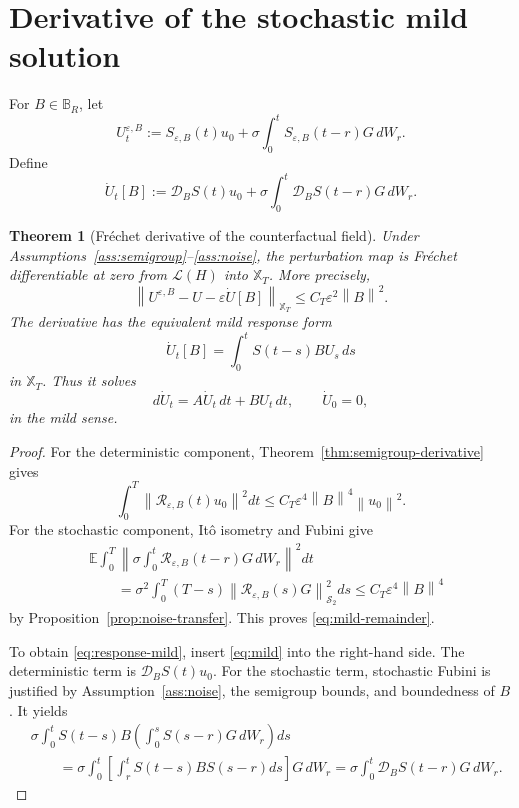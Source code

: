 \documentclass[11pt]{article}
\newtheorem{theorem}[assumption]{Theorem}
\theoremstyle{remark}
\newcommand{\E}{\mathbb E}
\newcommand{\cL}{\mathcal L}
\newcommand{\cX}{\mathbb X_T}
\newcommand{\HS}{\mathcal S_2}
\newcommand{\norm}[1]{\left\lVert #1\right\rVert}
\begin{document}
\section{Derivative of the stochastic mild solution}

For $B\in\mathbb B_R$, let
\begin{equation}\label{eq:pert-mild}
 U_t^{\varepsilon,B}
 :=
 S_{\varepsilon,B}(t)u_0
 +\sigma\int_0^tS_{\varepsilon,B}(t-r)G\,dW_r.
\end{equation}
Define
\begin{equation}\label{eq:dotU}
 \dot U_t[B]
 :=
 \mathcal D_BS(t)u_0
 +\sigma\int_0^t\mathcal D_BS(t-r)G\,dW_r.
\end{equation}

\begin{theorem}[Fr\'echet derivative of the counterfactual field]\label{thm:mild-derivative}
Under Assumptions~\ref{ass:semigroup}--\ref{ass:noise}, the perturbation map is Fr\'echet differentiable at zero from $\cL(H)$ into $\cX$. More precisely,
\begin{equation}\label{eq:mild-remainder}
 \norm{U^{\varepsilon,B}-U-\varepsilon\dot U[B]}_{\cX}
 \le C_T\varepsilon^2\norm{B}^2.
\end{equation}
The derivative has the equivalent mild response form
\begin{equation}\label{eq:response-mild}
 \dot U_t[B]
 =
 \int_0^tS(t-s)BU_s\,ds
\end{equation}
in $\cX$. Thus it solves
\begin{equation}\label{eq:response-equation}
 d\dot U_t=A\dot U_t\,dt+BU_t\,dt,
 \qquad
 \dot U_0=0,
\end{equation}
in the mild sense.
\end{theorem}

\begin{proof}
For the deterministic component, Theorem~\ref{thm:semigroup-derivative} gives
\[
 \int_0^T\norm{\mathcal R_{\varepsilon,B}(t)u_0}^2dt
 \le C_T\varepsilon^4\norm{B}^4\norm{u_0}^2.
\]
For the stochastic component, It\^o isometry and Fubini give
\begin{align*}
 &\E\int_0^T
 \norm{
 \sigma\int_0^t\mathcal R_{\varepsilon,B}(t-r)G\,dW_r
 }^2dt\\
 &\qquad=
 \sigma^2\int_0^T(T-s)
 \norm{\mathcal R_{\varepsilon,B}(s)G}_{\HS}^2ds
 \le C_T\varepsilon^4\norm{B}^4
\end{align*}
by Proposition~\ref{prop:noise-transfer}. This proves \eqref{eq:mild-remainder}.

To obtain \eqref{eq:response-mild}, insert \eqref{eq:mild} into the right-hand side. The deterministic term is $\mathcal D_BS(t)u_0$. For the stochastic term, stochastic Fubini is justified by Assumption~\ref{ass:noise}, the semigroup bounds, and boundedness of $B$. It yields
\begin{align*}
 &\sigma\int_0^tS(t-s)B
 \left(\int_0^sS(s-r)G\,dW_r\right)ds\\
 &\qquad=
 \sigma\int_0^t
 \left[
 \int_r^tS(t-s)BS(s-r)ds
 \right]G\,dW_r
 =
 \sigma\int_0^t\mathcal D_BS(t-r)G\,dW_r.
\end{align*}
\end{proof}
\end{document}
